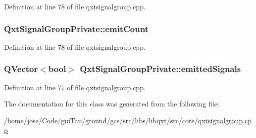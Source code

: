 Definition at line 78 of file qxtsignalgroup.\-cpp.

\hypertarget{class_qxt_signal_group_private_a0291d0223e965478ec2642d0c1194b34}{
\subsubsection[{emit\-Count}]{ Qxt\-Signal\-Group\-Private\-::emit\-Count}}\label{class_qxt_signal_group_private_a0291d0223e965478ec2642d0c1194b34}


Definition at line 78 of file qxtsignalgroup.\-cpp.

\hypertarget{class_qxt_signal_group_private_a8934d259abc16403d6b2468d92be4cf4}{
\subsubsection[{emitted\-Signals}]{\setlength{\rightskip}{0pt plus 5cm}Q\-Vector$<$bool$>$ Qxt\-Signal\-Group\-Private\-::emitted\-Signals}}\label{class_qxt_signal_group_private_a8934d259abc16403d6b2468d92be4cf4}


Definition at line 77 of file qxtsignalgroup.\-cpp.



The documentation for this class was generated from the following file\-:\begin{DoxyCompactItemize}
\item 
/home/jose/\-Code/gui\-Tau/ground/gcs/src/libs/libqxt/src/core/\hyperlink{qxtsignalgroup_8cpp}{qxtsignalgroup.\-cpp}\end{DoxyCompactItemize}
